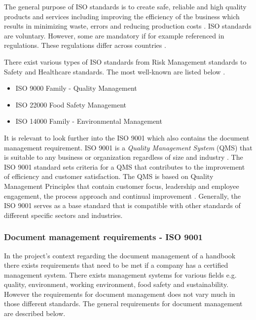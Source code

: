 The general purpose of ISO standards is to create safe, reliable and high quality products and services including improving the efficiency of the business which results in minimizing waste, errors and reducing production costs \cite{ISOinfo}. %
ISO standards are voluntary.
However, some are mandatory if for example referenced in regulations.
These regulations differ across countries \cite{ISOreviewedevery5years}.

There exist various types of ISO standards from Risk Management standards to Safety and Healthcare standards. The most well-known are listed below \citep{ISOmostpopularlist}.

\begin{itemize}
	\item ISO 9000 Family - Quality Management
	\item ISO 22000 Food Safety Management
	\item ISO 14000 Family - Environmental Management
\end{itemize}

It is relevant to look further into the ISO 9001 which also contains the document management requirement.
ISO 9001 is a \textit{Quality Management System} (QMS) that is suitable to any business or organization regardless of size and industry \cite{ISO9001}.
The ISO 9001 standard sets criteria for a QMS that contributes to the improvement of efficiency and customer satisfaction.
The QMS is based on Quality Management Principles that contain customer focus, leadership and employee engagement, the process approach and continual improvement \cite{ISO9001-2}.
Generally, the ISO 9001 serves as a base standard that is compatible with other standards of different specific sectors and industries.

\subsubsection{Document management requirements - ISO 9001} \label{sec:DMR}
In the project's context regarding the document management of a handbook there exists requirements that need to be met if a company has a certified management system. There exists management systems for various fields e.g. quality, environment, working environment, food safety and sustainability. However the requirements for document management does not vary much in those different standards.
The general requirements for document management are described below.


